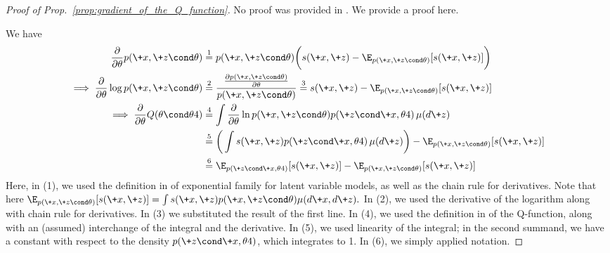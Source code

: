\documentclass{article} %
\newcommand{\sufficientStatsFunction}{s}
\newcommand{\param}{\theta}
\begin{document}
 
\begin{proof}[Proof of Prop.~\ref{prop:gradient_of_the_Q_function}] No proof was provided in \citet{salakhutdinov2002relationship}. We provide a proof here.

We have 
\begin{align*}
\frac{\partial}{\partial \param}  p(\+x, \+z \cond \param) & \stackrel{1}{=} p(\+x, \+z \cond \param) \bigg( \sufficientStatsFunction(\+x, \+z) - \E
_{p(\+x,\+z \cond \param)} [\sufficientStatsFunction(\+x, \+z)] \bigg) \\
\implies \frac{\partial}{\partial \param}  \log p(\+x, \+z \cond \param) & \stackrel{2}{=} \frac{\frac{\partial p(\+x, \+z \cond \param)}{\partial \param}}{p(\+x, \+z \cond \param)} \stackrel{3}{=}  \sufficientStatsFunction(\+x, \+z) - \E
_{p(\+x,\+z \cond \param)} [\sufficientStatsFunction(\+x, \+z)] \\
\implies \frac{\partial}{\partial \param}  Q(\param \cond \param^^t) & \stackrel{4}{=} \int \frac{\partial}{\partial \param} \ln p(
\+x ,\+z \cond \param) p(\+z \cond \+x, \param^^t) \, \mu(d\+z) \\
& \stackrel{5}{=} \bigg( \int \sufficientStatsFunction(\+x, \+z) p(\+z \cond \+x, \param^^t) \, \mu(d\+z)\bigg) - \E
_{p(\+x,\+z \cond \param)} [\sufficientStatsFunction(\+x, \+z)]  \\
& \stackrel{6}{=} \E
_{p(\+z \cond \+x, \param^^t)} [\sufficientStatsFunction(\+x, \+z)]   - \E
_{p(\+x,\+z \cond \param)} [\sufficientStatsFunction(\+x, \+z)] 
\end{align*}
%
Here, in (1), we used the definition in  of exponential family for latent variable models, as well as the chain rule for derivatives.   Note that here $\E
_{p(\+x,\+z \cond \param)} [\sufficientStatsFunction(\+x, \+z)] =  \int \sufficientStatsFunction(\+x, \+z) p(\+x,\+z \cond \param) \mu(d\+x, d\+z).$ In (2), we used the derivative of the logarithm along with chain rule for derivatives. In (3) we substituted the result of the first line. In (4), we used the definition in 
of the Q-function, along with an (assumed) interchange of the integral and the derivative. In (5), we used linearity of the integral; in the second summand, we have a constant with respect to the density $p(\+z \cond \+x, \param^^t)$, which integrates to 1.  In (6), we simply applied notation.  
\end{proof}
\end{document}
